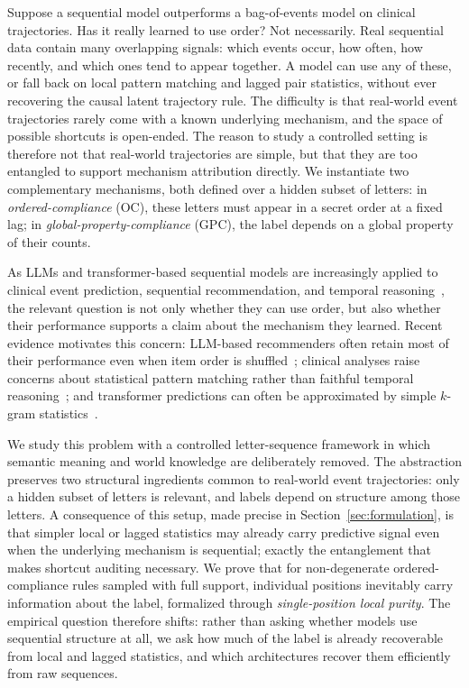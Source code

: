 \documentclass[fullpaper]{nldl}
\theoremstyle{plain}
\theoremstyle{definition}
\theoremstyle{remark}
\begin{document}
Suppose a sequential model outperforms a bag-of-events model on clinical trajectories. Has it really learned to use order? Not necessarily. Real sequential data contain many overlapping signals: which events occur, how often, how recently, and which ones tend to appear together. A model can use any of these, or fall back on local pattern matching and lagged pair statistics, without ever recovering the causal latent trajectory rule. The difficulty is that real-world event trajectories rarely come with a known underlying mechanism, and the space of possible shortcuts is open-ended. The reason to study a controlled setting is therefore not that real-world trajectories are simple, but that they are too entangled to support mechanism attribution directly. We instantiate two complementary mechanisms, both defined over a hidden subset of letters: in \emph{ordered-compliance} (OC), these letters must appear in a secret order at a fixed lag; in \emph{global-property-compliance} (GPC), the label depends on a global property of their counts.

As LLMs and transformer-based sequential models are increasingly applied to clinical event prediction, sequential recommendation, and temporal reasoning~\citep{savcisens2024using,delphi2025transformer,li2020behrt,rasmy2021medbert,fatemiTESTTIMEBENCHMARK2025}, the relevant question is not only whether they can use order, but also whether their performance supports a claim about the mechanism they learned. Recent evidence motivates this concern: LLM-based recommenders often retain most of their performance even when item order is shuffled~\citep{kimLostSequenceLarge2025b}; clinical analyses raise concerns about statistical pattern matching rather than faithful temporal reasoning~\citep{bediFidelityMedicalReasoning2025}; and transformer predictions can often be approximated by simple $k$-gram statistics~\citep{nguyen2024understanding}.

We study this problem with a controlled letter-sequence framework in which semantic meaning and world knowledge are deliberately removed. The abstraction preserves two structural ingredients common to real-world event trajectories: only a hidden subset of letters is relevant, and labels depend on structure among those letters. A consequence of this setup, made precise in Section~\ref{sec:formulation}, is that simpler local or lagged statistics may already carry predictive signal even when the underlying mechanism is sequential; exactly the entanglement that makes shortcut auditing necessary. We prove that for non-degenerate ordered-compliance rules sampled \iid with full support, individual positions inevitably carry information about the label, formalized through \emph{single-position local purity}. The empirical question therefore shifts: rather than asking whether models use sequential structure at all, we ask how much of the label is already recoverable from local and lagged statistics, and which architectures recover them efficiently from raw sequences.
\end{document}
